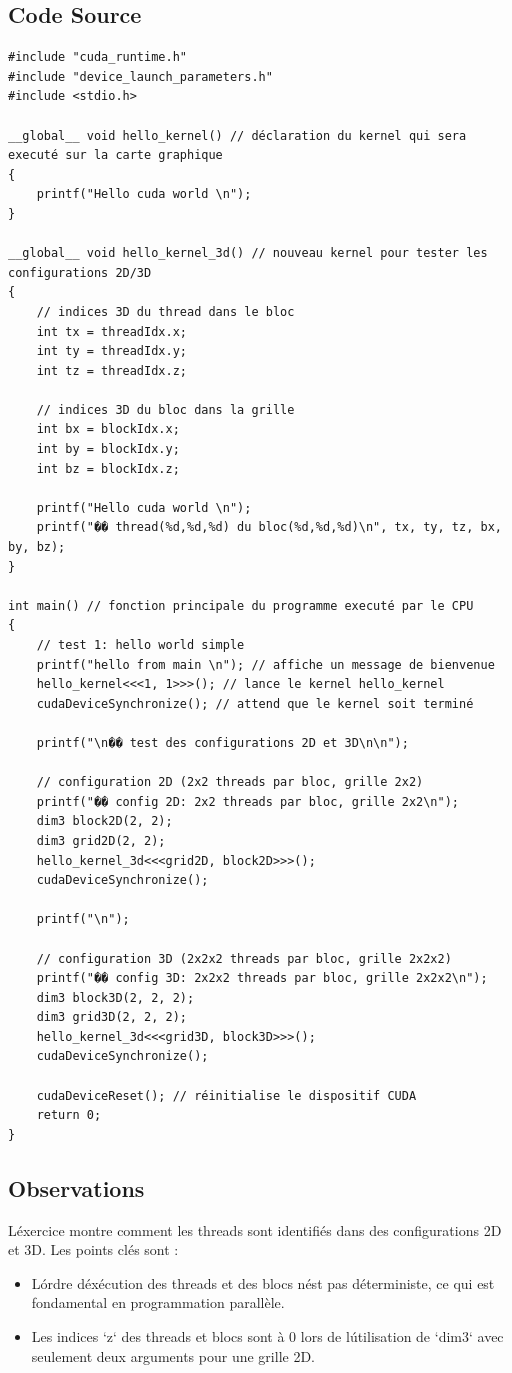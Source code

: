 \documentclass[a4paper,11pt]{article}
\begin{document}
\subsection{Code Source}
\begin{lstlisting}[caption=Code de l\'exercice 2 (exercice2.cu)]
#include "cuda_runtime.h"
#include "device_launch_parameters.h"
#include <stdio.h>

__global__ void hello_kernel() // déclaration du kernel qui sera executé sur la carte graphique
{
    printf("Hello cuda world \n");
}

__global__ void hello_kernel_3d() // nouveau kernel pour tester les configurations 2D/3D
{
    // indices 3D du thread dans le bloc
    int tx = threadIdx.x;
    int ty = threadIdx.y;
    int tz = threadIdx.z;
    
    // indices 3D du bloc dans la grille
    int bx = blockIdx.x;
    int by = blockIdx.y;
    int bz = blockIdx.z;
    
    printf("Hello cuda world \n");
    printf("�� thread(%d,%d,%d) du bloc(%d,%d,%d)\n", tx, ty, tz, bx, by, bz);
}

int main() // fonction principale du programme executé par le CPU
{
    // test 1: hello world simple
    printf("hello from main \n"); // affiche un message de bienvenue
    hello_kernel<<<1, 1>>>(); // lance le kernel hello_kernel
    cudaDeviceSynchronize(); // attend que le kernel soit terminé
    
    printf("\n�� test des configurations 2D et 3D\n\n");
    
    // configuration 2D (2x2 threads par bloc, grille 2x2)
    printf("�� config 2D: 2x2 threads par bloc, grille 2x2\n");
    dim3 block2D(2, 2);
    dim3 grid2D(2, 2);
    hello_kernel_3d<<<grid2D, block2D>>>();
    cudaDeviceSynchronize();
    
    printf("\n");
    
    // configuration 3D (2x2x2 threads par bloc, grille 2x2x2)
    printf("�� config 3D: 2x2x2 threads par bloc, grille 2x2x2\n");
    dim3 block3D(2, 2, 2);
    dim3 grid3D(2, 2, 2);
    hello_kernel_3d<<<grid3D, block3D>>>();
    cudaDeviceSynchronize();
    
    cudaDeviceReset(); // réinitialise le dispositif CUDA
    return 0;
}
\end{lstlisting}

\subsection{Observations}
L\'exercice montre comment les threads sont identifiés dans des configurations 2D et 3D. Les points clés sont :
\begin{itemize}
    \item L\'ordre d\'exécution des threads et des blocs n\'est pas déterministe, ce qui est fondamental en programmation parallèle.
    \item Les indices `z` des threads et blocs sont à 0 lors de l\'utilisation de `dim3` avec seulement deux arguments pour une grille 2D.
\end{itemize}
\end{document}
